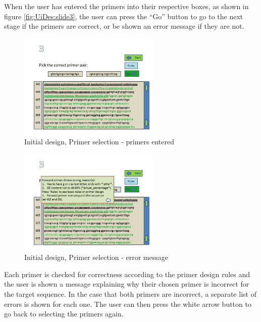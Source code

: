 When the user has entered the primers into their respective boxes, as
shown in figure \ref{fig:UiDes:slide3}, the user can press the ``Go'' button
to go to the next stage if the primers are correct, or be shown an
error message if they are not.

\begin{figure}[h]
  \begin{center}
	\includegraphics[width=0.6\textwidth]{./images/UiDes/Slide4.JPG}
    \caption{
      \label{fig:UiDes:slide4}
      Initial design, Primer selection - primers entered
    }
  \end{center}
\end{figure}

\begin{figure}[h]
  \begin{center}
	\includegraphics[width=0.6\textwidth]{./images/UiDes/slide5.jpg}
    \caption{
      \label{fig:UiDes:slide5}
      Initial design, Primer selection - error message
    }
  \end{center}
\end{figure}

Each primer is checked for correctness according to the primer design
rules and the user is shown a message explaining why their chosen primer
is incorrect for the target sequence.
In the case that both primers are incorrect, a separate list of errors
is shown for each one.
The user can then press the white arrow button to go back to selecting
the primers again.



